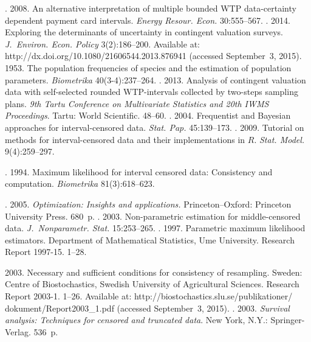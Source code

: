\begin{multicols}{2}
{{\begin{thebibliography}{99}
.  2008.
An alternative interpretation of multiple
bounded WTP data-certainty dependent payment card intervals.
\textit{Energy Resour. Econ.} 30:555--567.
. 2014.
Exploring the determinants of uncertainty in contingent valuation surveys. 
\textit{J.~Environ. Econ. Policy} 3(2):186--200.  
Available at: {\sf http://dx.doi.org/10.1080/21606544.2013.876941}
(accessed  September~3, 2015).
 1953.
The population frequencies of species and the estimation of population
parameters. \textit{Biometrika} 40(3-4):237--264.
. 2013.  
Analysis of contingent valuation data
with self-selected rounded WTP-intervals collected by two-steps sampling plans.
\textit{9th Tartu Conference on Multivariate Statistics and 20th IWMS Proceedings}.
Tartu: World Scientific. 48--60.
. 2004. Frequentist and Bayesian approaches for
interval-censored data. \textit{Stat. Pap.} 45:139--173.
. 2009. 
Tutorial on methods for interval-censored
data and their implementations in $R$. \textit{Stat. Model.} 9(4):259--297.

. 1994. 
Maximum likelihood for interval censored data:
Consistency and computation. \textit{Biometrika}  81(3):618--623.

. 2005.  
\textit{Optimization: Insights and applications.}
Princeton--Oxford: Princeton University Press. 680~p.
. 2003. 
Non-parametric estimation for middle-censored data.
\textit{J.~Nonparametr. Stat.} 15:253--265.
. 1997. Parametric maximum likelihood estimators.
Department of Mathematical Statistics,
\mbox{Ume} University. 
Research Report 1997-15. 1--28.

 2003. 
Necessary and sufficient conditions for consistency of resampling. Sweden:
Centre of Biostochastics, Swedish University of Agricultural
Sciences. Research Report 2003-1. 1--26.
Available at: 
{\sf http://biostochastics.slu.se/publikationer/ dokument/Report2003\_1.pdf}
(accessed September~3, 2015).
.  
2003. \textit{Survival analysis: Techniques for censored
 and truncated data}.  New York, N.Y.: Springer-Verlag. 536~p.

\end{thebibliography} } }

\end{multicols}

